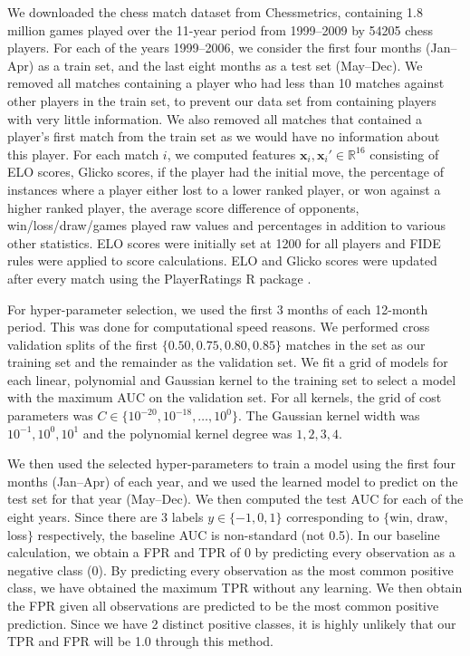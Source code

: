 \documentclass[twoside,11pt]{article}
\newcommand{\RR}{\mathbb R}
\begin{document}
We downloaded the chess match dataset from Chessmetrics\footnotemark, containing
1.8 million games played over the 11-year period from 1999--2009 by
54205 chess players.  For each of the years 1999--2006, we consider the
first four months (Jan--Apr) as a train set, and the last eight months
as a test set (May--Dec). 
We
removed all matches containing a player who had less than 10 matches
against other players in the train set, to prevent our data set from
containing players with very little information.  We also removed all
matches that contained a player's first match from the train set as we
would have no information about this player.
For each match $i$, we computed features
$\mathbf x_i,\mathbf x_i'\in\RR^{16}$ consisting of ELO
scores, Glicko scores, if the player had the initial move, the
percentage of instances where a player either lost to a lower ranked
player, or won against a higher ranked player, the average score
difference of opponents, win/loss/draw/games played raw values and
percentages in addition to various other statistics. ELO scores were
initially set at 1200 for all players and FIDE rules were applied to
score calculations.  ELO and Glicko scores were updated after every
match using the PlayerRatings R package  \citep{play-raitings}.  

For hyper-parameter selection, we used the first 3 months of each
12-month period.  This was done for computational speed reasons.  We performed cross validation splits of the first
$\{0.50,0.75,0.80,0.85\}$ matches in the set as our training set and
the remainder as the validation set.  We fit a grid of models for each
linear, polynomial and Gaussian kernel to the training set to select a
model with the maximum AUC on the validation set.  For all kernels,
the grid of cost parameters was
$C\in\{10^{-20},10^{-18}, \dots,10^0\}$. The Gaussian kernel width was
$10^{-1},10^{0},10^1$ and the polynomial kernel degree was
$1,2,3,4$.  

We then used the selected hyper-parameters to train a
model using the first four months (Jan--Apr) of each year, and we used
the learned model to predict on the test set for that year
(May--Dec). We then computed the test AUC for each of the eight years. Since there are 3 labels $y\in\{-1,0,1\}$ corresponding to $\{$win, draw, loss$\}$ respectively, the baseline AUC is non-standard (not 0.5). In our baseline calculation, we obtain a FPR and TPR of 0 by predicting every observation as a negative class (0).  By predicting every observation as the most common positive class, we have obtained the maximum TPR without any learning.  We then obtain the FPR given all observations are predicted to be the most common positive prediction.  Since we have 2 distinct positive classes, it is highly unlikely that our TPR and FPR will be 1.0 through this method.
\end{document}
